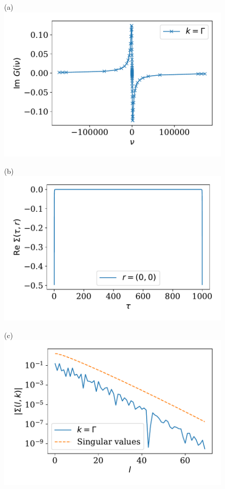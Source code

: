 \documentclass[submission, LectureNotes]{SciPost}
\begin{document}
\begin{figure}
    \begin{minipage}{0.5\columnwidth}
        \centering
        (a)
        \includegraphics[width=\columnwidth]{second_order_giv.pdf}
    \end{minipage}
    \begin{minipage}{0.5\columnwidth}
        \centering
        (b)
        \includegraphics[width=\columnwidth]{second_order_sigma_r.pdf}
    \end{minipage}
    \begin{minipage}{0.5\columnwidth}
        \centering
        (c)
        \includegraphics[width=\columnwidth]{second_order_sigma_k_ir.pdf}

\end{minipage}
\end{figure}
\end{document}
